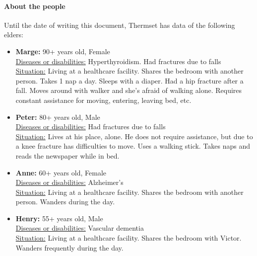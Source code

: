 \documentclass[oneside, twocolumn]{article}
\begin{document}
\paragraph{About the people}
Until the date of writing this document, Thermset has data of the following elders:
\begin{itemize}
	\item \textbf{Marge:} 90+ years old, Female \\
			\underline{Diseases or disabilities:} Hyperthyroidism. Had fractures due to falls \\
			\underline{Situation:} Living at a healthcare facility. Shares the bedroom with another person. Takes 1 nap a day. Sleeps with a diaper. Had a hip fracture after a fall. Moves around with walker and she’s afraid of walking alone. Requires constant assistance for moving, entering, leaving bed, etc. \\
	\item \textbf{Peter:} 80+ years old, Male \\
			\underline{Diseases or disabilities:} Had fractures due to falls \\
			\underline{Situation:} Lives at his place, alone. He does not require assistance, but due to a knee fracture has difficulties to move. Uses a walking stick. Takes naps and reads the newspaper while in bed. \\
	\item \textbf{Anne:} 60+ years old, Female \\
			\underline{Diseases or disabilities:} Alzheimer’s \\
			\underline{Situation:} Living at a healthcare facility. Shares the bedroom with another person. Wanders during the day. \\
	\item \textbf{Henry:} 55+ years old,  Male \\
		  	\underline{Diseases or disabilities:} Vascular dementia \\
		  	\underline{Situation:} Living at a healthcare facility. Shares the bedroom with Victor. Wanders frequently during the day. \\


\end{itemize}
\end{document}
